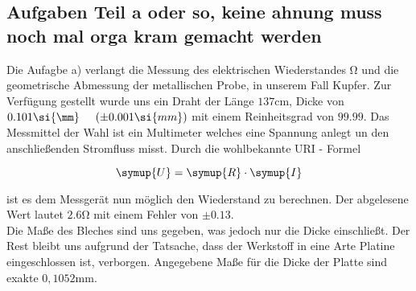 \subsection{Aufgaben Teil a oder so, keine ahnung muss noch mal orga kram gemacht werden}
\label{sec:aufgabe_a}

Die Aufagbe a) verlangt die Messung des elektrischen Wiederstandes $\si{\ohm}$ und die geometrische Abmessung der metallischen Probe, in unserem Fall Kupfer.
Zur Verfügung gestellt wurde uns ein Draht der Länge $137\si{\cm}$, Dicke von $0.101 \si{\mm} \hspace{0.5cm} (\pm 0.001 \si{mm})$ mit einem Reinheitsgrad von $99.99$. 
Das Messmittel der Wahl ist ein Multimeter welches eine Spannung anlegt un den anschließenden Stromfluss misst.
Durch die wohlbekannte  URI - Formel 

\begin{equation}
   \symup{U} = \symup{R} \cdot \symup{I}
\end{equation}

ist es dem  Messgerät nun möglich den Wiederstand zu berechnen.
Der abgelesene Wert lautet $2.6\si{\ohm}$ mit einem Fehler von $\pm 0.13$. \\ 

Die Maße des Bleches sind uns gegeben, was jedoch nur die Dicke einschließt. %
Der Rest bleibt uns aufgrund der Tatsache, dass der Werkstoff in eine Arte Platine eingeschlossen ist, verborgen.
Angegebene Maße für die Dicke der Platte sind exakte $0,1052\si{\mm}$.
